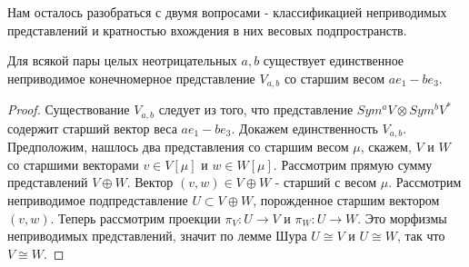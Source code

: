 \documentclass[a4article]{article}
\begin{document}
Нам осталось разобраться с двумя вопросами - классификацией неприводимых представлений и кратностью вхождения в них весовых подпространств.
\begin{theorem}
    Для всякой пары целых неотрицательных $a, b$ существует единственное неприводимое конечномерное представление $V_{a,b}$ со старшим весом $ae_1 - be_3$.
\end{theorem}
\begin{proof}
    Существование $V_{a,b}$ следует из того, что представление $Sym^a V \otimes Sym^b V^*$ содержит старший вектор веса $ae_1 - be_3$. Докажем единственность $V_{a,b}$. Предположим, нашлось два представления со старшим весом $\mu$, скажем, $V$ и $W$ со старшими векторами $v \in V[\mu]$ и $w \in W[\mu]$. Рассмотрим прямую сумму представлений $V \oplus W$. Вектор $(v, w) \in V \oplus W$ - старший с весом $\mu$. Рассмотрим неприводимое подпредставление $U \subset V\oplus W$, порожденное старшим вектором $(v, w)$. Теперь рассмотрим проекции $\pi_V: U \rightarrow V$ и $\pi_W: U \rightarrow W$. Это морфизмы неприводимых представлений, значит по лемме Шура $U \cong V$ и $U \cong W$, так что $V \cong W$.
\end{proof}
\end{document}
